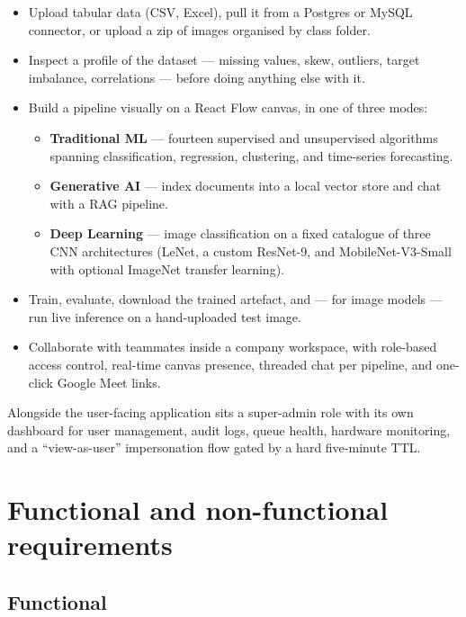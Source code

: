 \documentclass[12pt, a4paper]{report}
\begin{document}
\begin{itemize}
    \item Upload tabular data (CSV, Excel), pull it from a Postgres or
        MySQL connector, or upload a zip of images organised by class
        folder.
    \item Inspect a profile of the dataset --- missing values, skew,
        outliers, target imbalance, correlations --- before doing
        anything else with it.
    \item Build a pipeline visually on a React Flow canvas, in one of
        three modes:
        \begin{itemize}
            \item \textbf{Traditional ML} --- fourteen supervised and
                unsupervised algorithms spanning classification,
                regression, clustering, and time-series forecasting.
            \item \textbf{Generative AI} --- index documents into a
                local vector store and chat with a RAG pipeline.
            \item \textbf{Deep Learning} --- image classification on a
                fixed catalogue of three CNN architectures (LeNet, a
                custom ResNet-9, and MobileNet-V3-Small with optional
                ImageNet transfer learning).
        \end{itemize}
    \item Train, evaluate, download the trained artefact, and --- for
        image models --- run live inference on a hand-uploaded test
        image.
    \item Collaborate with teammates inside a company workspace, with
        role-based access control, real-time canvas presence, threaded
        chat per pipeline, and one-click Google Meet links.
\end{itemize}

Alongside the user-facing application sits a super-admin role with its
own dashboard for user management, audit logs, queue health, hardware
monitoring, and a ``view-as-user'' impersonation flow gated by a hard
five-minute TTL.

\section{Functional and non-functional requirements}

\subsection{Functional}
\end{document}
